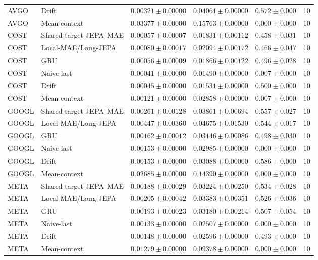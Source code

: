 \begin{longtable}{llrrrr}
AVGO & Drift & $0.00321 \pm 0.00000$ & $0.04061 \pm 0.00000$ & $0.572 \pm 0.000$ & 10 \\
AVGO & Mean-context & $0.03377 \pm 0.00000$ & $0.15763 \pm 0.00000$ & $0.000 \pm 0.000$ & 10 \\
COST & Shared-target JEPA--MAE & $0.00057 \pm 0.00007$ & $0.01831 \pm 0.00112$ & $0.458 \pm 0.031$ & 10 \\
COST & Local-MAE/Long-JEPA & $0.00080 \pm 0.00017$ & $0.02094 \pm 0.00172$ & $0.466 \pm 0.047$ & 10 \\
COST & GRU & $0.00056 \pm 0.00009$ & $0.01866 \pm 0.00122$ & $0.496 \pm 0.028$ & 10 \\
COST & Naive-last & $0.00041 \pm 0.00000$ & $0.01490 \pm 0.00000$ & $0.007 \pm 0.000$ & 10 \\
COST & Drift & $0.00045 \pm 0.00000$ & $0.01531 \pm 0.00000$ & $0.500 \pm 0.000$ & 10 \\
COST & Mean-context & $0.00121 \pm 0.00000$ & $0.02858 \pm 0.00000$ & $0.007 \pm 0.000$ & 10 \\
GOOGL & Shared-target JEPA--MAE & $0.00261 \pm 0.00128$ & $0.03861 \pm 0.00694$ & $0.557 \pm 0.027$ & 10 \\
GOOGL & Local-MAE/Long-JEPA & $0.00447 \pm 0.00360$ & $0.04675 \pm 0.01530$ & $0.544 \pm 0.017$ & 10 \\
GOOGL & GRU & $0.00162 \pm 0.00012$ & $0.03146 \pm 0.00086$ & $0.498 \pm 0.030$ & 10 \\
GOOGL & Naive-last & $0.00153 \pm 0.00000$ & $0.02985 \pm 0.00000$ & $0.000 \pm 0.000$ & 10 \\
GOOGL & Drift & $0.00153 \pm 0.00000$ & $0.03088 \pm 0.00000$ & $0.586 \pm 0.000$ & 10 \\
GOOGL & Mean-context & $0.02685 \pm 0.00000$ & $0.14390 \pm 0.00000$ & $0.000 \pm 0.000$ & 10 \\
META & Shared-target JEPA--MAE & $0.00188 \pm 0.00029$ & $0.03224 \pm 0.00250$ & $0.534 \pm 0.028$ & 10 \\
META & Local-MAE/Long-JEPA & $0.00205 \pm 0.00042$ & $0.03383 \pm 0.00351$ & $0.526 \pm 0.036$ & 10 \\
META & GRU & $0.00193 \pm 0.00023$ & $0.03180 \pm 0.00214$ & $0.507 \pm 0.054$ & 10 \\
META & Naive-last & $0.00133 \pm 0.00000$ & $0.02507 \pm 0.00000$ & $0.000 \pm 0.000$ & 10 \\
META & Drift & $0.00148 \pm 0.00000$ & $0.02596 \pm 0.00000$ & $0.493 \pm 0.000$ & 10 \\
META & Mean-context & $0.01279 \pm 0.00000$ & $0.09378 \pm 0.00000$ & $0.000 \pm 0.000$ & 10 \\

\end{longtable}
